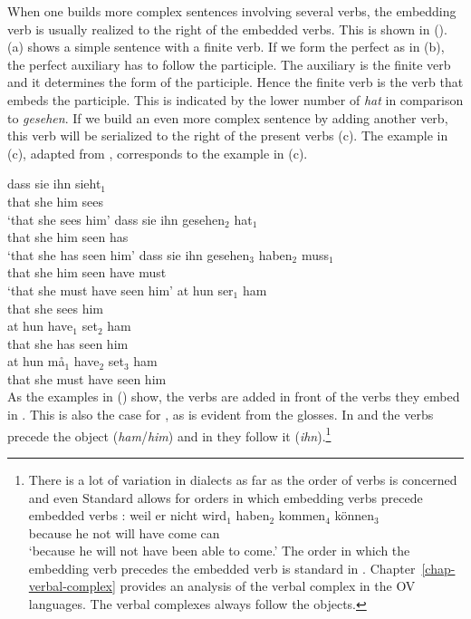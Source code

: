 When one builds more complex  sentences involving several verbs, the embedding verb is usually
realized to the right of the embedded verbs. 
This is shown in (). (a) shows a simple
sentence with a finite verb. If we form the perfect as in (b), the perfect auxiliary has to
follow the participle. The auxiliary is the finite verb and it determines the form of the
participle. Hence the finite verb is the verb that embeds the participle. This is indicated by the
lower number of \emph{hat} in comparison to \emph{gesehen}. If we build an even more complex
sentence by adding another verb, this verb will be serialized to the right of the present verbs
(c).  The  example in (c), adapted from \citet[]{Oersnes2009b}, corresponds to the
 example in (c).

\eal
\ex
\gll dass sie ihn sieht$_1$\\
     that she him sees\\
\glt `that she sees him'
\ex
\gll dass sie ihn gesehen$_2$ hat$_1$\\
     that she him seen        has\\
\glt `that she has seen him'
\ex
\gll dass sie ihn gesehen$_3$ haben$_2$ muss$_1$\\
     that she him seen        have     must\\
\glt `that she must have seen him'
\zl
\eal
\label{ex-Danish-embedding}
\ex
\gll at   hun ser$_1$ ham\\
     that she  sees    him\\
\ex
\gll at   hun have$_1$ set$_2$ ham\\
     that she  has      seen    him\\
\ex
\gll at   hun må$_1$ have$_2$ set$_3$ ham\\
     that she  must   have     seen   him\\
\zl
%
As the examples in () show, the verbs are added in front of the verbs they embed in
. This is also the case for , as is evident from the glosses. In  and  the
verbs precede the object (\emph{ham}/\emph{him}) and in  they follow it
(\emph{ihn}).\footnote{
There is a lot of variation in  dialects as far as the order of verbs is concerned and even
Standard  allows for orders in which embedding verbs precede embedded verbs \parencites[--64]{Bech55a}[]{dBE83a}:
\ea
\gll weil er nicht wird$_1$ haben$_2$ kommen$_4$ können$_3$\\
     because he not will have come   can\\\german
\glt `because he will not have been able to come.'
\z
The order in which the embedding verb precedes the embedded verb is standard in  \citep[]{dBE83a}. Chapter~\ref{chap-verbal-complex}
provides an analysis of the verbal complex in the  OV languages. The verbal complexes always follow the objects.  
} 

